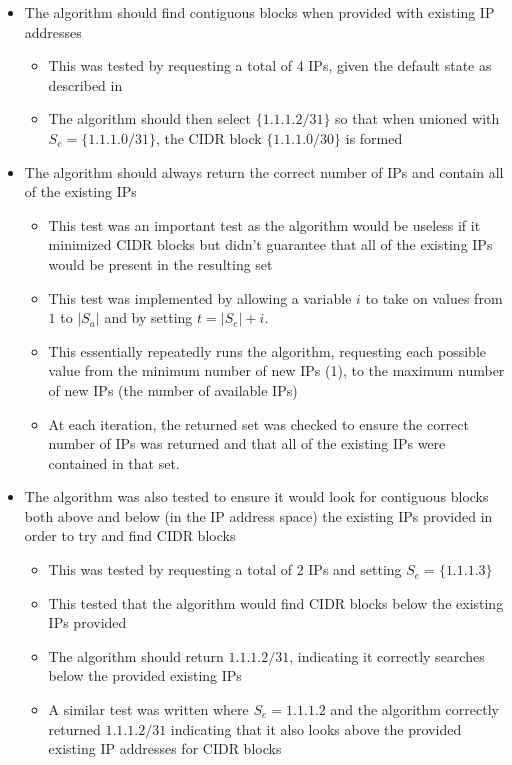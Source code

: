 \begin{itemize}
\item{The algorithm should find contiguous blocks when provided with existing IP addresses}
      \begin{itemize}
      \item{This was tested by requesting a total of 4 IPs, given the default state as described in }
      \item{The algorithm should then select $\{1.1.1.2/31\}$} so that when unioned with $S_e = \{1.1.1.0/31\}$, the CIDR block $\{1.1.1.0/30\}$  is formed 
      \end{itemize}
\item{The algorithm should always return the correct number of IPs and contain all of the existing IPs}
      \begin{itemize}
      \item{This test was an important test as the algorithm would be useless if it minimized CIDR blocks but didn't guarantee that all of the existing IPs would be present in the resulting set}
      \item{This test was implemented by allowing a variable $i$ to take on values from $1$ to $|S_a|$ and by setting $t = |S_e| + i$.}
      \item{This essentially repeatedly runs the algorithm, requesting each possible value from the minimum number of new IPs (1), to the maximum number of new IPs (the number of available IPs)}
      \item{At each iteration, the returned set was checked to ensure the correct number of IPs was returned and that all of the existing IPs were contained in that set.}
      \end{itemize}
\item{The algorithm was also tested to ensure it would look for contiguous blocks both above and below (in the IP address space) the existing IPs provided in order to try and find CIDR blocks}
      \begin{itemize}
      \item{This was tested by requesting a total of 2 IPs and setting $S_e = \{1.1.1.3\}$}
      \item{This tested that the algorithm would find CIDR blocks below the existing IPs provided}
      \item{The algorithm should return $1.1.1.2/31$, indicating it correctly searches below the provided existing IPs}
      \item{A similar test was written where $S_e = {1.1.1.2}$ and the algorithm correctly returned $1.1.1.2/31$ indicating that it also looks above the provided existing IP addresses for CIDR blocks}

\end{itemize}
\end{itemize}
